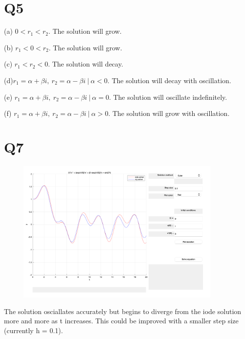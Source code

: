 \documentclass[12pt]{article}
\begin{document}
\section*{Q5}
(a) $0 < r_1 < r_2$. The solution will grow.

(b) $r_1 < 0 < r_2$. The solution will grow.

(c) $r_1 < r_2 < 0$. The solution will decay.

(d)$ r_1 = \alpha + \beta i, \  r_2 = \alpha - \beta i \ |\  \alpha < 0$. The solution will decay with oscillation.

(e) $r_1 = \alpha + \beta i, \  r_2 = \alpha - \beta i \ |\  \alpha = 0$. The solution will oscillate indefinitely.

(f) $r_1 = \alpha + \beta i, \  r_2 = \alpha - \beta i \ |\  \alpha > 0$. The solution will grow with oscillation.

\section*{Q7}

\begin{figure}[H]
    \centering
    \includegraphics[width=0.9\textwidth]{images/q7.png}
\end{figure}

The solution osciallates accurately but begins to diverge from the iode
solution more and more as t increases. This could be improved with a smaller step size (currently h = 0.1).
\end{document}
